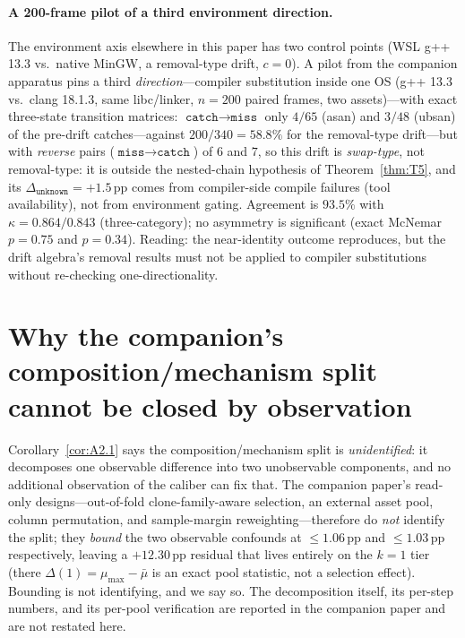 \documentclass{article}
\newcommand{\catch}{\texttt{catch}}
\newcommand{\miss}{\texttt{miss}}
\newcommand{\unk}{\texttt{unknown}}
\newcommand{\pp}{\,\mathrm{pp}}
\begin{document}
\paragraph{A 200-frame pilot of a third environment direction.} The environment axis elsewhere in this paper
has two control points (WSL g++ 13.3 vs.\ native MinGW, a removal-type drift, $c=0$). A pilot from the
companion apparatus pins a third \emph{direction}---compiler substitution inside one OS (g++ 13.3 vs.\
clang 18.1.3, same libc/linker, $n=200$ paired frames, two assets)---with exact three-state transition
matrices: $\catch\to\miss$ only $4/65$ (asan) and $3/48$ (ubsan) of the pre-drift catches---against
$200/340=58.8\%$ for the removal-type drift---but with \emph{reverse} pairs ($\miss\to\catch$) of $6$ and
$7$, so this drift is \emph{swap-type}, not removal-type: it is outside the nested-chain hypothesis of
Theorem~\ref{thm:T5}, and its $\Delta_{\unk}=+1.5\pp$ comes from compiler-side compile failures (tool
availability), not from environment gating. Agreement is $93.5\%$ with $\kappa=0.864/0.843$
(three-category); no asymmetry is significant (exact McNemar $p=0.75$ and $p=0.34$). Reading: the
near-identity outcome reproduces, but the drift algebra's removal results must not be applied to
compiler substitutions without re-checking one-directionality.

\section{Why the companion's composition/mechanism split cannot be closed by observation}
\label{app:f1causal}

Corollary~\ref{cor:A2.1} says the composition/mechanism split is \emph{unidentified}: it decomposes one
observable difference into two unobservable components, and no additional observation of the caliber can
fix that. The companion paper's read-only designs---out-of-fold clone-family-aware selection, an external
asset pool, column permutation, and sample-margin reweighting---therefore do \emph{not} identify the split;
they \emph{bound} the two observable confounds at $\le1.06\pp$ and $\le1.03\pp$ respectively, leaving a
$+12.30\pp$ residual that lives entirely on the $k=1$ tier (there $\Delta(1)=\mu_{\max}-\bar\mu$ is an exact
pool statistic, not a selection effect). Bounding is not identifying, and we say so. The
decomposition itself, its per-step numbers, and its per-pool verification are reported in the
companion paper and are not restated here.
\end{document}

